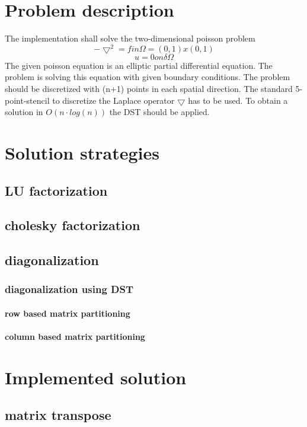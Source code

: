 \documentclass{article}
\begin{document}
\section{Problem description}
The implementation shall solve the two-dimensional poisson problem 
\begin{equation}
-\bigtriangledown^2=f in \Omega = (0,1)x(0,1)
\end{equation}
\begin{equation}
u = 0 on \delta\Omega
\end{equation}
The given poisson equation is an elliptic partial differential equation. The problem is solving this equation with given boundary conditions. 
The problem should be discretized with (n+1) points in each spatial direction. The standard 5-point-stencil to discretize the Laplace operator $\bigtriangledown$ has to be used. To obtain a solution in $O(n\cdot log(n))$ the DST should be applied.
\section{Solution strategies}
\subsection{LU factorization}
\subsection{cholesky factorization}
\subsection{diagonalization}
\subsubsection{diagonalization using DST}
\paragraph{row based matrix partitioning}
\paragraph{column based matrix partitioning}
\section{Implemented solution}
\subsection{matrix transpose}
\end{document}
